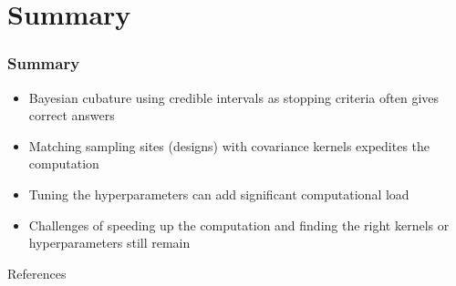 \documentclass[11pt,compress,xcolor={usenames,dvipsnames},aspectratio=169]{beamer}
\begin{document}
\section{Summary}
\begin{frame}\frametitle{Summary}
	
\vspace{-5ex}
	
\begin{itemize}
	\item Bayesian cubature using credible intervals as stopping criteria often gives correct answers
	
	\item Matching sampling sites (designs) with covariance kernels expedites the computation
	
	\item Tuning the hyperparameters can add significant computational load
	
	\item Challenges of speeding up the computation and finding the right kernels or hyperparameters still remain
\end{itemize}
	
\end{frame}





\thankyouframe

\begin{frame}[allowframebreaks]{References}
\printbibliography
\end{frame}
	
\end{document}
